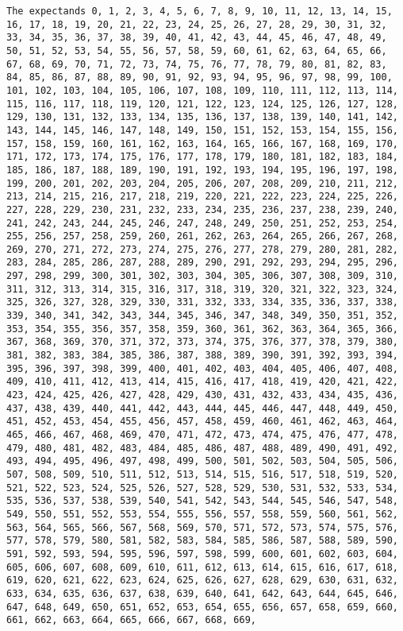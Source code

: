 \documentclass[
  letterpaper,
  DIV=11,
  numbers=noendperiod]{scrartcl}
\begin{document}
\begin{verbatim}
The expectands 0, 1, 2, 3, 4, 5, 6, 7, 8, 9, 10, 11, 12, 13, 14, 15, 16, 17, 18, 19, 20, 21, 22, 23, 24, 25, 26, 27, 28, 29, 30, 31, 32, 33, 34, 35, 36, 37, 38, 39, 40, 41, 42, 43, 44, 45, 46, 47, 48, 49, 50, 51, 52, 53, 54, 55, 56, 57, 58, 59, 60, 61, 62, 63, 64, 65, 66, 67, 68, 69, 70, 71, 72, 73, 74, 75, 76, 77, 78, 79, 80, 81, 82, 83, 84, 85, 86, 87, 88, 89, 90, 91, 92, 93, 94, 95, 96, 97, 98, 99, 100, 101, 102, 103, 104, 105, 106, 107, 108, 109, 110, 111, 112, 113, 114, 115, 116, 117, 118, 119, 120, 121, 122, 123, 124, 125, 126, 127, 128, 129, 130, 131, 132, 133, 134, 135, 136, 137, 138, 139, 140, 141, 142, 143, 144, 145, 146, 147, 148, 149, 150, 151, 152, 153, 154, 155, 156, 157, 158, 159, 160, 161, 162, 163, 164, 165, 166, 167, 168, 169, 170, 171, 172, 173, 174, 175, 176, 177, 178, 179, 180, 181, 182, 183, 184, 185, 186, 187, 188, 189, 190, 191, 192, 193, 194, 195, 196, 197, 198, 199, 200, 201, 202, 203, 204, 205, 206, 207, 208, 209, 210, 211, 212, 213, 214, 215, 216, 217, 218, 219, 220, 221, 222, 223, 224, 225, 226, 227, 228, 229, 230, 231, 232, 233, 234, 235, 236, 237, 238, 239, 240, 241, 242, 243, 244, 245, 246, 247, 248, 249, 250, 251, 252, 253, 254, 255, 256, 257, 258, 259, 260, 261, 262, 263, 264, 265, 266, 267, 268, 269, 270, 271, 272, 273, 274, 275, 276, 277, 278, 279, 280, 281, 282, 283, 284, 285, 286, 287, 288, 289, 290, 291, 292, 293, 294, 295, 296, 297, 298, 299, 300, 301, 302, 303, 304, 305, 306, 307, 308, 309, 310, 311, 312, 313, 314, 315, 316, 317, 318, 319, 320, 321, 322, 323, 324, 325, 326, 327, 328, 329, 330, 331, 332, 333, 334, 335, 336, 337, 338, 339, 340, 341, 342, 343, 344, 345, 346, 347, 348, 349, 350, 351, 352, 353, 354, 355, 356, 357, 358, 359, 360, 361, 362, 363, 364, 365, 366, 367, 368, 369, 370, 371, 372, 373, 374, 375, 376, 377, 378, 379, 380, 381, 382, 383, 384, 385, 386, 387, 388, 389, 390, 391, 392, 393, 394, 395, 396, 397, 398, 399, 400, 401, 402, 403, 404, 405, 406, 407, 408, 409, 410, 411, 412, 413, 414, 415, 416, 417, 418, 419, 420, 421, 422, 423, 424, 425, 426, 427, 428, 429, 430, 431, 432, 433, 434, 435, 436, 437, 438, 439, 440, 441, 442, 443, 444, 445, 446, 447, 448, 449, 450, 451, 452, 453, 454, 455, 456, 457, 458, 459, 460, 461, 462, 463, 464, 465, 466, 467, 468, 469, 470, 471, 472, 473, 474, 475, 476, 477, 478, 479, 480, 481, 482, 483, 484, 485, 486, 487, 488, 489, 490, 491, 492, 493, 494, 495, 496, 497, 498, 499, 500, 501, 502, 503, 504, 505, 506, 507, 508, 509, 510, 511, 512, 513, 514, 515, 516, 517, 518, 519, 520, 521, 522, 523, 524, 525, 526, 527, 528, 529, 530, 531, 532, 533, 534, 535, 536, 537, 538, 539, 540, 541, 542, 543, 544, 545, 546, 547, 548, 549, 550, 551, 552, 553, 554, 555, 556, 557, 558, 559, 560, 561, 562, 563, 564, 565, 566, 567, 568, 569, 570, 571, 572, 573, 574, 575, 576, 577, 578, 579, 580, 581, 582, 583, 584, 585, 586, 587, 588, 589, 590, 591, 592, 593, 594, 595, 596, 597, 598, 599, 600, 601, 602, 603, 604, 605, 606, 607, 608, 609, 610, 611, 612, 613, 614, 615, 616, 617, 618, 619, 620, 621, 622, 623, 624, 625, 626, 627, 628, 629, 630, 631, 632, 633, 634, 635, 636, 637, 638, 639, 640, 641, 642, 643, 644, 645, 646, 647, 648, 649, 650, 651, 652, 653, 654, 655, 656, 657, 658, 659, 660, 661, 662, 663, 664, 665, 666, 667, 668, 669, 
\end{verbatim}
\end{document}
